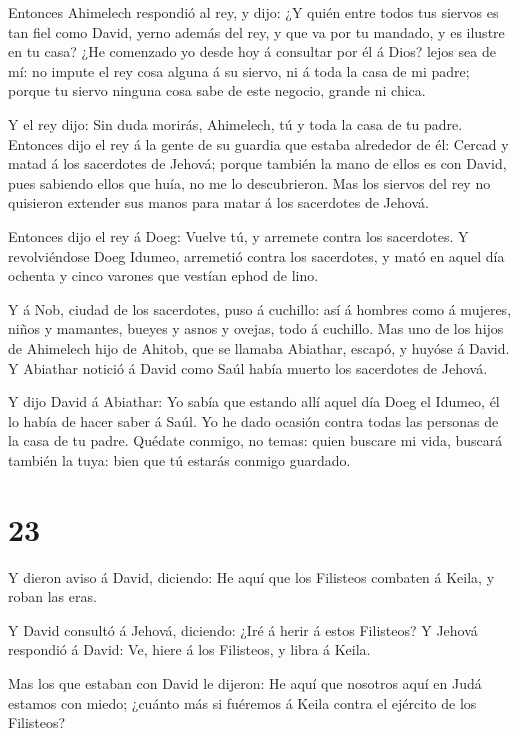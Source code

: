  Entonces Ahimelech respondió al rey, y dijo: ¿Y quién
entre todos tus siervos es tan fiel como David, yerno además del rey, y
que va por tu mandado, y es ilustre en tu casa?  ¿He
comenzado yo desde hoy á consultar por él á Dios? lejos sea de mí: no
impute el rey cosa alguna á su siervo, ni á toda la casa de mi padre;
porque tu siervo ninguna cosa sabe de este negocio, grande ni chica.

 Y el rey dijo: Sin duda morirás, Ahimelech, tú y toda la
casa de tu padre.  Entonces dijo el rey á la gente de su
guardia que estaba alrededor de él: Cercad y matad á los sacerdotes de
Jehová; porque también la mano de ellos es con David, pues sabiendo
ellos que huía, no me lo descubrieron. Mas los siervos del rey no
quisieron extender sus manos para matar á los sacerdotes de Jehová.

 Entonces dijo el rey á Doeg: Vuelve tú, y arremete contra
los sacerdotes. Y revolviéndose Doeg Idumeo, arremetió contra los
sacerdotes, y mató en aquel día ochenta y cinco varones que vestían
ephod de lino.

 Y á Nob, ciudad de los sacerdotes, puso á cuchillo: así á
hombres como á mujeres, niños y mamantes, bueyes y asnos y ovejas, todo
á cuchillo.  Mas uno de los hijos de Ahimelech hijo de
Ahitob, que se llamaba Abiathar, escapó, y huyóse á David. 
Y Abiathar notició á David como Saúl había muerto los sacerdotes de
Jehová.

 Y dijo David á Abiathar: Yo sabía que estando allí aquel
día Doeg el Idumeo, él lo había de hacer saber á Saúl. Yo he dado
ocasión contra todas las personas de la casa de tu padre. 
Quédate conmigo, no temas: quien buscare mi vida, buscará también la
tuya: bien que tú estarás conmigo guardado.

\hypertarget{section-22}{%
\section{23}\label{section-22}}

 Y dieron aviso á David, diciendo: He aquí que los Filisteos
combaten á Keila, y roban las eras.

 Y David consultó á Jehová, diciendo: ¿Iré á herir á estos
Filisteos? Y Jehová respondió á David: Ve, hiere á los Filisteos, y
libra á Keila.

 Mas los que estaban con David le dijeron: He aquí que
nosotros aquí en Judá estamos con miedo; ¿cuánto más si fuéremos á Keila
contra el ejército de los Filisteos?

